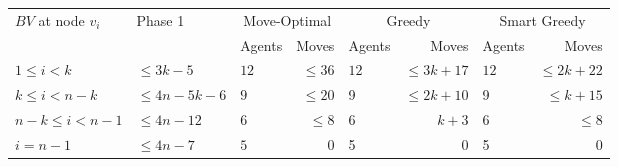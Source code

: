 \begin{center}

\begin{tabular}{|l|l|lr|lr|lr|}\hline
\multirow{2}{1.2 in}{$BV$ at node $v_i$} &
\multirow{2}{1.2 in}{Phase 1} & 

\multicolumn{2}{c|}{Move-Optimal} &
\multicolumn{2}{c|}{Greedy}&
\multicolumn{2}{c|}{Smart Greedy} \\
& & Agents & Moves & Agents & Moves& Agents & Moves \\\hline\hline
$1\leq i<k$  &$\leq 3k-5$     & $12$ & $\leq 36$ & $12$ & $\leq 3k+17$ & $12$   &$\leq 2k+22$ \\\hline
$k\leq i<n-k$   &$\leq 4n-5k-6$ & $9$   & $\leq 20$ & 9       & $\leq 2k+10$   & 9         & $\leq k+15$     \\\hline
$n-k\leq i<n-1$ &$\leq 4n-12$ & $6$   & $\leq 8$   & 6      & $ k+3$      & 6         & $\leq 8$               \\\hline
$ i=n-1$           &$\leq 4n-7$ & $5$   & $0$         & 5      & $0$                  & 5        & $0$          \\\hline
\end{tabular}
\end{center}


